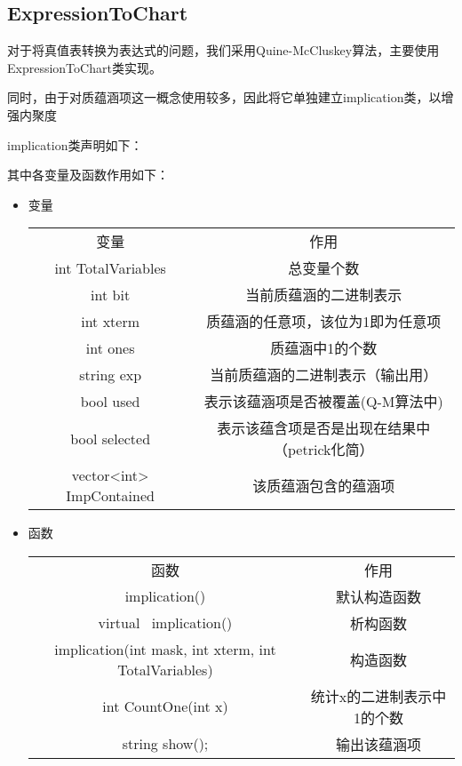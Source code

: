 \subsection{ExpressionToChart}
对于将真值表转换为表达式的问题，我们采用Quine-McCluskey算法，主要使用ExpressionToChart类实现。

同时，由于对质蕴涵项这一概念使用较多，因此将它单独建立implication类，以增强内聚度

implication类声明如下：


其中各变量及函数作用如下：

\begin{itemize}
	\item{变量}
	\begin{center}
		\begin{tabular}{cc}
			变量 & 作用 \\
			int TotalVariables & 总变量个数\\
			int bit & 当前质蕴涵的二进制表示\\
			int xterm & 质蕴涵的任意项，该位为1即为任意项 \\
			int ones & 质蕴涵中1的个数 \\
			string exp & 当前质蕴涵的二进制表示（输出用）\\
			bool used & 表示该蕴涵项是否被覆盖(Q-M算法中)\\
			bool selected & 表示该蕴含项是否是出现在结果中（petrick化简） \\
			vector<int> ImpContained & 该质蕴涵包含的蕴涵项\\

		\end{tabular}
	\end{center}
	\item{函数}
	\begin{center}
		\begin{tabular}{cc}
			函数 & 作用 \\
			implication() & 默认构造函数\\
			virtual ~implication() & 析构函数 \\
			implication(int mask, int xterm, int TotalVariables) & 构造函数\\
			int CountOne(int x) & 统计x的二进制表示中1的个数\\
			string show(); & 输出该蕴涵项\\
		\end{tabular}
	\end{center}
\end{itemize}


